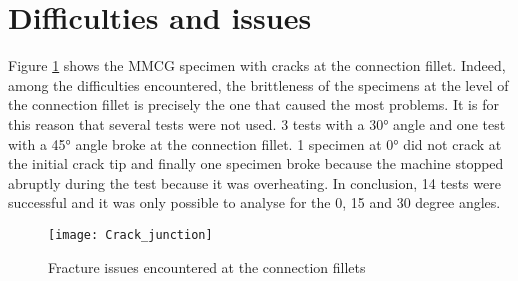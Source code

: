 \section{Difficulties and issues}

Figure \ref{fig:Crack_junction} shows the MMCG specimen with cracks at the connection fillet. Indeed, among the difficulties encountered, the brittleness of the specimens at the level of the connection fillet is precisely the one that caused the most problems. It is for this reason that several tests were not used. 3 tests with a 30° angle and one test with a 45° angle broke at the connection fillet. 1 specimen at 0° did not crack at the initial crack tip and finally one specimen broke because the machine stopped abruptly during the test because it was overheating. In conclusion, 14 tests were successful and it was only possible to analyse for the 0, 15 and 30 degree angles.

\begin{figure}[htp]
	\centering
	\texttt{[image: Crack\_junction]}
	\caption{Fracture issues encountered at the connection fillets}
	\label{fig:Crack_junction}
\end{figure}